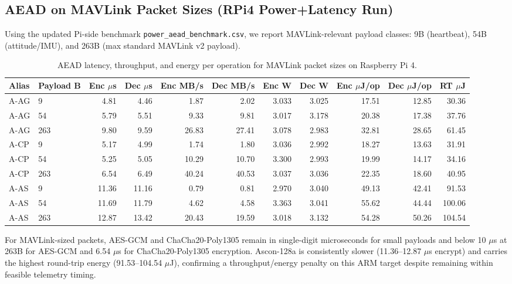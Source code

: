 \subsection{AEAD on MAVLink Packet Sizes (RPi4 Power+Latency Run)}
Using the updated Pi-side benchmark \texttt{power\_aead\_benchmark.csv}, we report MAVLink-relevant payload classes: 9B (heartbeat), 54B (attitude/IMU), and 263B (max standard MAVLink v2 payload).
\begin{table}[t]
\centering
\caption{AEAD latency, throughput, and energy per operation for MAVLink packet sizes on Raspberry Pi 4.}
\footnotesize
\setlength{\tabcolsep}{2.6pt}
\begin{tabular}{@{}llrrrrrrrrr@{}}\toprule
Alias & Payload B & Enc $\mu$s & Dec $\mu$s & Enc MB/s & Dec MB/s & Enc W & Dec W & Enc $\mu$J/op & Dec $\mu$J/op & RT $\mu$J \\ \midrule
A-AG & 9 & 4.81 & 4.46 & 1.87 & 2.02 & 3.033 & 3.025 & 17.51 & 12.85 & 30.36 \\
A-AG & 54 & 5.79 & 5.51 & 9.33 & 9.81 & 3.017 & 3.178 & 20.38 & 17.38 & 37.76 \\
A-AG & 263 & 9.80 & 9.59 & 26.83 & 27.41 & 3.078 & 2.983 & 32.81 & 28.65 & 61.45 \\
A-CP & 9 & 5.17 & 4.99 & 1.74 & 1.80 & 3.036 & 2.992 & 18.27 & 13.63 & 31.91 \\
A-CP & 54 & 5.25 & 5.05 & 10.29 & 10.70 & 3.300 & 2.993 & 19.99 & 14.17 & 34.16 \\
A-CP & 263 & 6.54 & 6.49 & 40.24 & 40.53 & 3.037 & 3.036 & 22.35 & 18.60 & 40.95 \\
A-AS & 9 & 11.36 & 11.16 & 0.79 & 0.81 & 2.970 & 3.040 & 49.13 & 42.41 & 91.53 \\
A-AS & 54 & 11.69 & 11.79 & 4.62 & 4.58 & 3.363 & 3.041 & 55.62 & 44.44 & 100.06 \\
A-AS & 263 & 12.87 & 13.42 & 20.43 & 19.59 & 3.018 & 3.132 & 54.28 & 50.26 & 104.54 \\
\bottomrule\end{tabular}
\label{tab:aead-mavlink-power-latency}
\end{table}

For MAVLink-sized packets, AES-GCM and ChaCha20-Poly1305 remain in single-digit microseconds for small payloads and below 10 $\mu$s at 263B for AES-GCM and 6.54 $\mu$s for ChaCha20-Poly1305 encryption. Ascon-128a is consistently slower (11.36--12.87 $\mu$s encrypt) and carries the highest round-trip energy (91.53--104.54 $\mu$J), confirming a throughput/energy penalty on this ARM target despite remaining within feasible telemetry timing.

